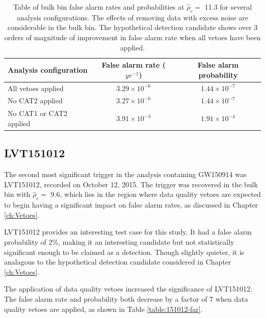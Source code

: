 \begin{table}[!ht]%
  \begin{center}
    \begin{tabular}{lcc}
      \hline
      Analysis configuration & False alarm rate ($yr^{-1}$) & False alarm probability \\ \hline
      All vetoes applied & $3.29\times10^{-6}$ & $1.44\times10^{-7}$\\
      No CAT2 applied & $3.27\times10^{-6}$ & $1.44\times10^{-7}$ \\
      No CAT1 or CAT2 applied & $3.91\times10^{-3}$ & $1.91\times10^{-4}$ \\
      \hline
    \end{tabular}
  \end{center}
  \caption[Bulk bin FAR - GW150914 analysis]{Table of bulk bin false alarm rates and probabilities at $\hat{\rho}_{c} =$ 11.3 %
           for several analysis configurations. %
           The effects of removing data with excess noise are considerable in the %
           bulk bin. The hypothetical detection candidate %
           shows over 3 orders of magnitude of improvement in false alarm rate
           when all vetoes have been applied.
           }
  \label{table:bulk-far}
\end{table}

\subsection{LVT151012}\label{sec:LVT151012}
The second most significant trigger in the analysis containing GW150914 was LVT151012,
recorded on October 12, 2015.
The trigger was recovered in the bulk bin with $\hat{\rho}_{c} =$ 9.6, which lies in the region
where data quality vetoes are expected to begin having a significant impact on false alarm rates,
as discussed in Chapter \ref{ch:Vetoes}.

LVT151012 provides an interesting test case for this study. It had a
false alarm probability of 2\%, making it an interesting candidate but not
statistically significant enough to be claimed as a detection. Though slightly quieter, it is
analagous
to the hypothetical detection candidate considered in Chapter \ref{ch:Vetoes}.

The application of data quality vetoes increased the significance of LVT151012.
The false alarm rate and probability both decrease by a factor of 7 when data quality vetoes are
applied, as shown in Table \ref{table:151012-far}.

